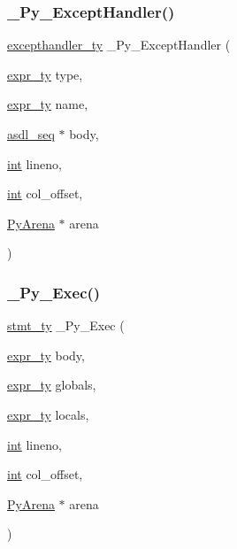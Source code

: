 \subsubsection{\texorpdfstring{\_Py\_ExceptHandler()}{\_Py\_ExceptHandler()}}
{\footnotesize\ttfamily \mbox{\hyperlink{_python-ast_8h_af85359ef2251f8c9819960684e134dfb}{excepthandler\+\_\+ty}} \+\_\+\+Py\+\_\+\+Except\+Handler (\begin{DoxyParamCaption}\item[{\mbox{\hyperlink{_python-ast_8h_a56d3705e020a071405094a220c4592bd}{expr\+\_\+ty}}}]{type,  }\item[{\mbox{\hyperlink{_python-ast_8h_a56d3705e020a071405094a220c4592bd}{expr\+\_\+ty}}}]{name,  }\item[{\mbox{\hyperlink{structasdl__seq}{asdl\+\_\+seq}} $\ast$}]{body,  }\item[{\mbox{\hyperlink{warnings_8h_a74f207b5aa4ba51c3a2ad59b219a423b}{int}}}]{lineno,  }\item[{\mbox{\hyperlink{warnings_8h_a74f207b5aa4ba51c3a2ad59b219a423b}{int}}}]{col\+\_\+offset,  }\item[{\mbox{\hyperlink{pyarena_8h_a9edeb357fbb27333471022a0975adb7a}{Py\+Arena}} $\ast$}]{arena }\end{DoxyParamCaption})}

\mbox{\label{_python-ast_8h_a99ce3e6b27859f459d9b50528048e693}} 
\subsubsection{\texorpdfstring{\_Py\_Exec()}{\_Py\_Exec()}}
{\footnotesize\ttfamily \mbox{\hyperlink{_python-ast_8h_a39618071027b661bc03e8916e664e1a7}{stmt\+\_\+ty}} \+\_\+\+Py\+\_\+\+Exec (\begin{DoxyParamCaption}\item[{\mbox{\hyperlink{_python-ast_8h_a56d3705e020a071405094a220c4592bd}{expr\+\_\+ty}}}]{body,  }\item[{\mbox{\hyperlink{_python-ast_8h_a56d3705e020a071405094a220c4592bd}{expr\+\_\+ty}}}]{globals,  }\item[{\mbox{\hyperlink{_python-ast_8h_a56d3705e020a071405094a220c4592bd}{expr\+\_\+ty}}}]{locals,  }\item[{\mbox{\hyperlink{warnings_8h_a74f207b5aa4ba51c3a2ad59b219a423b}{int}}}]{lineno,  }\item[{\mbox{\hyperlink{warnings_8h_a74f207b5aa4ba51c3a2ad59b219a423b}{int}}}]{col\+\_\+offset,  }\item[{\mbox{\hyperlink{pyarena_8h_a9edeb357fbb27333471022a0975adb7a}{Py\+Arena}} $\ast$}]{arena }\end{DoxyParamCaption})}

